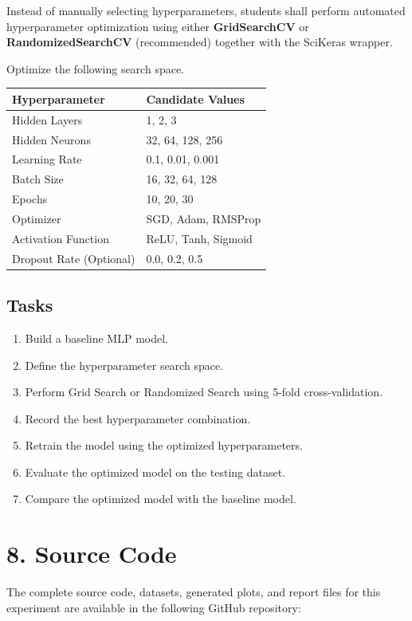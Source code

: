 \documentclass[11pt]{article}
\begin{document}
Instead of manually selecting hyperparameters, students shall perform automated hyperparameter optimization using either \textbf{GridSearchCV} or \textbf{RandomizedSearchCV} (recommended) together with the SciKeras wrapper.

Optimize the following search space.

\begin{center}
\begin{tabular}{|p{5cm}|p{7cm}|}
\hline
Hyperparameter & Candidate Values\\
\hline
Hidden Layers & 1, 2, 3\\
Hidden Neurons & 32, 64, 128, 256\\
Learning Rate & 0.1, 0.01, 0.001\\
Batch Size & 16, 32, 64, 128\\
Epochs & 10, 20, 30\\
Optimizer & SGD, Adam, RMSProp\\
Activation Function & ReLU, Tanh, Sigmoid\\
Dropout Rate (Optional) & 0.0, 0.2, 0.5\\
\hline
\end{tabular}
\end{center}

\subsection*{Tasks}

\begin{enumerate}
\item Build a baseline MLP model.
\item Define the hyperparameter search space.
\item Perform Grid Search or Randomized Search using 5-fold cross-validation.
\item Record the best hyperparameter combination.
\item Retrain the model using the optimized hyperparameters.
\item Evaluate the optimized model on the testing dataset.
\item Compare the optimized model with the baseline model.
\end{enumerate}

\section*{8. Source Code}


The complete source code, datasets, generated plots, and report files for this experiment are available in the following GitHub repository:
\end{document}
